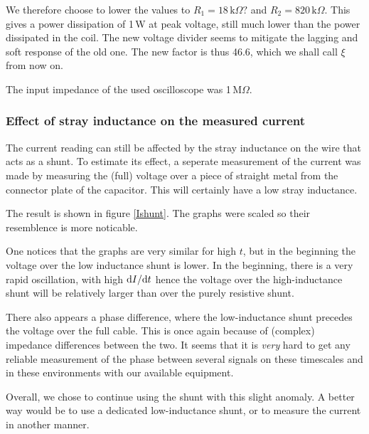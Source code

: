 
We therefore choose to lower the values to $R_1 = 18\,\mathrm{k}\Omega?$ 
and $R_2 = 820\,\mathrm{k}\Omega$. This gives a power dissipation of 1\,W 
at peak voltage, still much lower than the power dissipated in the coil.  
The new voltage divider seems to mitigate the lagging and soft response of 
the old one. The new factor is thus 46.6, which we shall call $\xi$ from 
now on.






The input impedance of the used oscilloscope was 1\,M$\Omega$.



\subsubsection{Effect of stray inductance on the measured current}
The current reading can still be affected by the stray inductance on the 
wire that acts as a shunt. To estimate its effect, a seperate measurement 
of the current was made by measuring the (full) voltage over a piece of 
straight metal from the connector plate of the capacitor. This will 
certainly have a low stray inductance.

The result is shown in figure \ref{Ishunt}. The graphs were scaled so their 
resemblence is more noticable.


One notices that the graphs are very similar for high $t$, but in the 
beginning the voltage over the low inductance shunt is lower. In the 
beginning, there is a very rapid oscillation, with high $\mathrm d I / \mathrm d t$ 
hence the voltage over the high-inductance shunt will be relatively larger 
than over the purely resistive shunt.

There also appears a phase difference, where the low-inductance shunt 
precedes the voltage over the full cable. This is once again because of 
(complex) impedance differences between the two. It seems that it is 
\emph{very} hard to get any reliable measurement of the phase between 
several signals on these timescales and in these environments with our 
available equipment.

Overall, we chose to continue using the shunt with this slight anomaly.  A 
better way would be to use a dedicated low-inductance shunt, or to measure 
the current in another manner.




